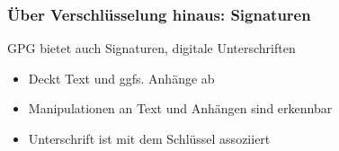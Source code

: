 \documentclass{beamer}
\begin{document}
\begin{frame}
  \frametitle{Über Verschlüsselung hinaus: Signaturen}
  GPG bietet auch Signaturen, digitale Unterschriften
  \begin{itemize}
  \item Deckt Text und ggfs. Anhänge ab
  \item Manipulationen an Text und Anhängen sind erkennbar
  \item Unterschrift ist mit dem Schlüssel assoziiert
  \end{itemize}
\end{frame}
\end{document}
